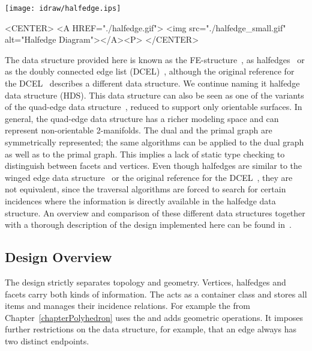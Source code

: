 \begin{ccTexOnly}
    \vspace{-4mm}
    \begin{center}
      \parbox{0.4\textwidth}{%
          \texttt{[image: idraw/halfedge.ips]}%
      }
    \end{center}
    \vspace{-3mm}
\end{ccTexOnly}

\begin{ccHtmlOnly}
    <CENTER>
    <A HREF="./halfedge.gif">
        <img src="./halfedge_small.gif" alt="Halfedge Diagram"></A><P>
    </CENTER>
\end{ccHtmlOnly}

The data structure provided here is known as the
FE-structure~\cite{w-ebdss-85}, as
halfedges~\cite{m-ism-88,bfh-mgedm-95} or as the doubly connected edge
list (DCEL)~\cite{bkos-cgaa-97}, although the original reference for
the DCEL~\cite{mp-fitcp-78} describes a different data structure. We
continue naming it halfedge data structure (HDS). This data structure
can also be seen as one of the variants of the quad-edge data
structure~\cite{gs-pmgsc-85}, reduced to support only orientable
surfaces. In general, the quad-edge data structure has a richer
modeling space and can represent non-orientable 2-manifolds. The dual
and the primal graph are symmetrically represented; the same
algorithms can be applied to the dual graph as well as to the primal
graph. This implies a lack of static type checking to distinguish
between facets and vertices.  Even though halfedges are similar to the
winged edge data structure~\cite{b-prcv-75} or the original reference
for the DCEL~\cite{mp-fitcp-78}, they are not equivalent, since the
traversal algorithms are forced to search for certain incidences where
the information is directly available in the halfedge data structure.
An overview and comparison of these different data structures together
with a thorough description of the design implemented here can be
found in~\cite{k-ddsps-98}.


\subsection*{Design Overview}

The design strictly separates topology and geometry. Vertices,
halfedges and facets carry both kinds of information. The
 acts as a container class and stores all
items and manages their incidence relations. For example the
 from Chapter~\ref{chapterPolyhedron} uses the
 and adds geometric operations. It
imposes further restrictions on the data structure, for example, that
an edge always has two distinct endpoints.


